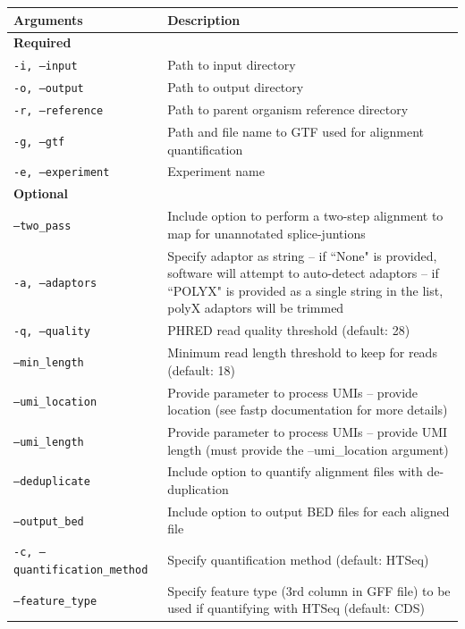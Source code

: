 \documentclass[10pt, oneside]{article}
\begin{document}
\begin{table}[!]
    \centering
{}
\begin{tabular}{p{5cm}p{13cm}}
 \textbf{Arguments} & \textbf{Description} \\
 \hline
 \textbf{Required} & \\
 \hline
 \texttt{-i, --input} & Path to input directory \\
 \hline
 \texttt{-o, --output} & Path to output directory \\
 \hline
 \texttt{-r, --reference} & Path to parent organism reference directory \\
 \hline
 \texttt{-g, --gtf} & Path and file name to GTF used for alignment quantification \\
 \hline
 \texttt{-e, --experiment} & Experiment name \\
 \hline
 \textbf{Optional} & \\
 \hline
 \texttt{--two\_pass} & Include option to perform a two-step alignment to map for unannotated splice-juntions \\
 \hline
 \texttt{-a, --adaptors} & Specify adaptor as string -- if ``None" is provided, software will attempt to auto-detect adaptors -- if ``POLYX" is provided as a single string in the list, polyX adaptors will be trimmed \\
 \hline
 \texttt{-q, --quality} & PHRED read quality threshold (default: 28) \\
 \hline
 \texttt{--min\_length} & Minimum read length threshold to keep for reads (default: 18) \\
 \hline
 \texttt{--umi\_location} & Provide parameter to process UMIs -- provide location (see fastp documentation for more details) \\
 \hline
 \texttt{--umi\_length} & Provide parameter to process UMIs -- provide UMI length (must provide the --umi\_location argument) \\
 \hline
 \texttt{--deduplicate} & Include option to quantify alignment files with de-duplication \\
 \hline
 \texttt{--output\_bed} & Include option to output BED files for each aligned file \\
 \hline
 \texttt{-c, --quantification\_method} & Specify quantification method (default: HTSeq\cite{htseq}) \\
 \hline
 \texttt{--feature\_type} & Specify feature type (3rd column in GFF file) to be used if quantifying with HTSeq (default: CDS) \\

\end{tabular}
\end{table}
\end{document}
